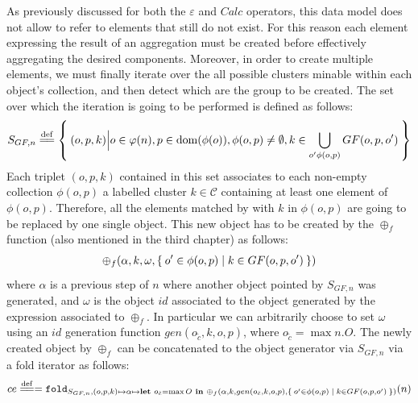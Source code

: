As previously discussed for both the $\varepsilon$ and $Calc$ operators, this data model does not allow to refer to elements that still do not exist. For this reason each element expressing the result of an aggregation must be created before effectively aggregating the desired components. Moreover, in order to create multiple elements, we must finally iterate over the all possible clusters minable within each object's collection, and then detect which are the group to be created. The set over which the iteration is going to be performed is defined as follows:
\[S_{GF,n}\overset{\mathrm{def}}{=\mathrel{\mkern-3mu}=}\Set{(o,p,k)\Big|o\in \varphi(n),p\in\operatorname{dom}(\phi(o)),\phi(o,p)\neq\emptyset, k\in\bigcup_{o'\phi(o,p)} GF(o,p,o')}\]
Each triplet $(o,p,k)$ contained in this set associates to each non-empty collection $\phi(o,p)$ a labelled cluster $k\in\mathcal{C}$ containing at least one element of $\phi(o,p)$. Therefore, all the elements matched by with $k$ in $\phi(o,p)$ are going to be replaced by one single object. This new object has to be created by the $\oplus_f$ function (also mentioned in the third chapter) as follows: 
\[\oplus_f(\alpha,k,\omega,\Set{o'\in\phi(o,p)|k\in GF(o,p,o')})\]
where $\alpha$ is a previous step of $n$ where another object pointed by $S_{GF,n}$ was generated, and $\omega$ is the object $id$ associated to the object generated by the expression associated to $\oplus_f$. In particular we can arbitrarily choose to set $\omega$ using an $id$ generation function $gen(o_{\tilde{c}},k,o,p)$, where  $o_{\tilde{c}} = \max n.O$. The newly created object by $\oplus_f$  can be concatenated to the object generator via $S_{GF,n}$ via a fold iterator as follows:
\begin{equation}\label{eq:ce}
ce\overset{\mathrm{def}}{=\mathrel{\mkern-3mu}=}=\texttt{fold}_{S_{GF,n},(o,p,k)\mapsto \alpha\mapsto\textbf{let }o_{\tilde{c}}=\max O\textbf{ in } \oplus_f(\alpha,k,gen(o_{\tilde{c}},k,o,p),\Set{o'\in\phi(o,p)|k\in GF(o,p,o')})}(n)
\end{equation}
